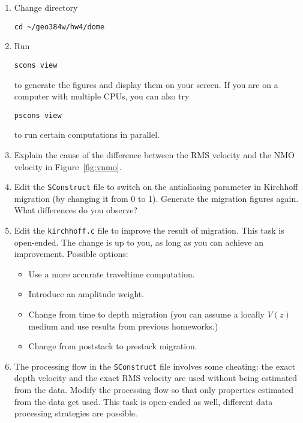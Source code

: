\begin{enumerate}
\begin{enumerate}
\item Change directory 
\begin{verbatim}
cd ~/geo384w/hw4/dome
\end{verbatim}
\item Run
\begin{verbatim}
scons view
\end{verbatim}
to generate the figures and display them on your screen.
If you are on a computer with multiple CPUs, you
can also try
\begin{verbatim}
pscons view
\end{verbatim}
to run certain computations in parallel.
\item Explain the cause of the difference between the RMS velocity and the NMO velocity in Figure~\ref{fig:vnmo}.
\item Edit the \texttt{SConstruct} file to switch on the antialiasing parameter in Kirchhoff migration 
(by changing it from 0 to 1). Generate the migration figures again. What differences do you observe?
\item Edit the \texttt{kirchhoff.c} file to improve the result of migration. This task is open-ended. 
The change is up to you, as long as you can achieve an improvement. Possible options:
\begin{itemize}
\item Use a more accurate traveltime computation.
\item Introduce an amplitude weight.
\item Change from time to depth migration (you can assume a locally $V(z)$ medium and use results from previous homeworks.)
\item Change from poststack to prestack migration.
\end{itemize}
\item The processing flow in the \texttt{SConstruct} file involves some cheating: the exact 
depth velocity and the exact RMS velocity are used without being
estimated from the data. Modify the processing flow so that only
properties estimated from the data get used. This task is open-ended
as well, different data processing strategies are possible.
\end{enumerate}

\lstset{language=python,numbers=left,numberstyle=\tiny,showstringspaces=false}


\lstset{language=c,numbers=left,numberstyle=\tiny,showstringspaces=false}



\end{enumerate}
